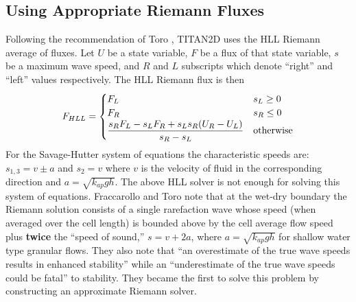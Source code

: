 \documentclass[review]{elsarticle}
\begin{document}
\subsection{Using Appropriate Riemann Fluxes} \label{Riemann}
Following the recommendation of Toro \cite{ToroBook2001}, TITAN2D uses 
the HLL Riemann average of fluxes. Let $U$ be a state variable, $F$ 
be a flux of that state variable, $s$ be a maximum wave speed, 
and $R$ and $L$ subscripts which denote ``right'' and ``left'' values 
respectively. The HLL Riemann flux is then
\begin{equation}
        F_{HLL}=\begin{cases}
                F_L & s_L\ge 0\\
                F_R & s_R\le 0\\
                \dfrac{s_RF_L-s_LF_R+s_Ls_R(U_R-U_L)}{s_R-s_L} & \textnormal{otherwise}
        \end{cases}
\end{equation}
For the Savage-Hutter system of equations the characteristic speeds are: $s_{1,3}=v\pm a$ and $s_2=v$ where $v$ is the 
velocity of fluid in the corresponding direction and $a=\sqrt{k_{ap}gh}$.
The above HLL solver is not enough for solving this system of equations.
Fraccarollo and Toro \cite{FraccarolloToro1995} note that at the 
wet-dry boundary the Riemann solution consists of a single rarefaction 
wave whose speed (when averaged over the cell length) 
is bounded above by the cell average flow speed plus 
{\bf twice} the ``speed of sound,'' $s=v+2a$, where $a=\sqrt{k_{ap}gh}$ 
for shallow water type granular flows.  They also note that ``an overestimate 
of the true wave speeds results in enhanced stability'' while an 
``underestimate of the true wave speeds could be fatal'' to stability.
They became the first to 
solve this problem by constructing an approximate Riemann solver.
\end{document}
